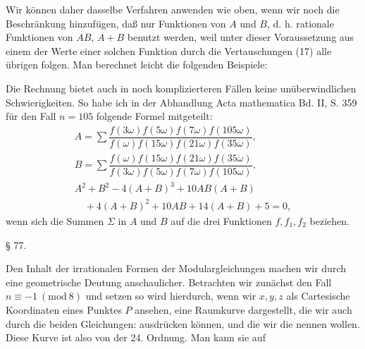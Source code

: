 Wir können daher dasselbe Verfahren anwenden wie oben, wenn wir noch
die Beschränkung hinzufügen, daß nur  Funktionen
von $A$ und $B$, d. h. rationale Funktionen von $AB$, $A+B$ benutzt
werden, weil  unter dieser Voraussetzung aus einem der Werte einer
solchen Funktion durch die Vertauschungen (17) alle übrigen folgen. Man
berechnet leicht die folgenden Beispiele:

Die Rechnung bietet auch in noch komplizierteren Fällen keine
unüberwindlichen Schwierigkeiten. So habe ich in der Abhandlung Acta
mathematica Bd. II, S. 359 für den Fall $n = 105$ folgende Formel
mitgeteilt:
\[
\begin{array}{l}
A = \sum \dfrac{f(3\omega)f(5\omega)f(7\omega)f(105\omega)}{f(\omega)f(15\omega)f(21\omega)f(35\omega)}, \\[2ex]
B = \sum \dfrac{f(\omega)f(15\omega)f(21\omega)f(35\omega)}{f(3\omega)f(5\omega)f(7\omega)f(105\omega)}, \\[2ex]
A^2+B^2-4(A+B)^3+10AB(A+B) \\
\quad{}+4(A+B)^2+10AB+14(A+B)+5 = 0,
\end{array}
\]
wenn sich die Summen $\Sigma$ in $A$ und $B$ auf die drei Funktionen
$f, f_1, f_2$ beziehen.

\begin{center}
§ 77.\quad {}\\
\end{center}

Den Inhalt der irrationalen Formen der Modulargleichungen machen wir
durch eine geometrische Deutung anschaulicher. Betrachten wir zunächst
den Fall $n \equiv -1 \ (\mathrm{mod}\ 8)$ und setzen
so wird hierdurch, wenn wir $x, y, z$ als Cartesische Koordinaten eines
Punktes $P$ ansehen, eine Raumkurve dargestellt, die wir auch durch die
beiden Gleichungen:
ausdrücken können, und die wir die  nennen wollen.
Diese Kurve ist also von der 24. Ordnung. Man kann sie auf
